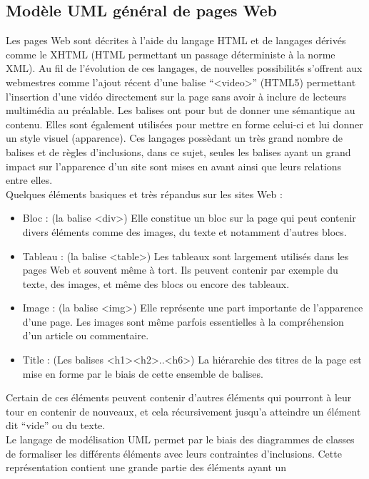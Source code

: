 \documentclass[french,a4paper]{report}
\begin{document}
{\subsection{Modèle UML général de pages Web}
\label{sctumlgeneral}
Les pages Web sont décrites à l'aide du langage HTML et de langages
dérivés comme le XHTML (HTML permettant un passage déterministe à la
norme XML). Au fil de l'évolution de ces langages, de nouvelles
possibilités s'offrent aux webmestres comme l'ajout récent d'une
balise \enquote{<video>} (HTML5) permettant l'insertion d'une vidéo
directement sur la page sans avoir à inclure de lecteurs multimédia au
préalable. Les balises ont pour but de donner une sémantique au
contenu. Elles sont également utilisées pour mettre en forme
celui-ci et lui donner un style visuel (apparence). Ces langages
possèdant un très grand nombre de balises et de règles d'inclusions, dans
ce sujet, seules les balises ayant un grand impact sur l'apparence d'un
site sont mises en avant ainsi que leurs relations entre elles.
\\
Quelques éléments basiques et très répandus sur les sites Web :
\begin{itemize} \itemsep1em
\item Bloc : (la balise <div>) Elle constitue un bloc sur la page qui
peut contenir divers éléments comme des images, du texte et
notamment d'autres blocs.
\item Tableau : (la balise <table>) Les tableaux sont largement
utilisés dans les pages Web et souvent même à tort. Ils peuvent
contenir par exemple du texte, des images, et même des blocs ou
encore des tableaux.
\item Image : (la balise <img>) Elle représente une part importante de
l'apparence d'une page. Les images sont même parfois essentielles à la
compréhension d'un article ou commentaire.
\item Title : (Les balises <h1><h2>..<h6>) La hiérarchie des titres de
la page est mise en forme
par le biais de cette ensemble de balises.\\
\end{itemize}
Certain de ces éléments peuvent contenir d'autres éléments qui
pourront à leur tour en contenir de nouveaux, et cela récursivement
jusqu'a atteindre un élément dit \enquote{vide} ou du texte.
\\
Le langage de modélisation UML permet par le biais des diagrammes de
classes de formaliser les différents éléments avec leurs contraintes
d'inclusions.
Cette représentation contient une grande partie des éléments ayant un
}
\end{document}
